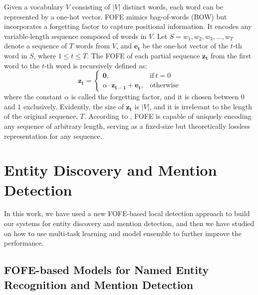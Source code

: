 \documentclass[11pt]{article}
\begin{document}
Given a vocabulary $V$ consisting of $|V|$ distinct words, each word can be represented by a one-hot vector. 
FOFE mimics bag-of-words (BOW) but incorporates a forgetting factor to capture positional information.
It encodes any variable-length sequence composed of words in $V$. 
Let $S = {w_1, w_2, w_3, ... , w_T}$ denote a sequence of $T$ words from $V$, 
and $\bm{e_t}$ be the one-hot vector of the $t$-th word in $S$, where $1 \leq t \leq T$.
The FOFE of each partial sequence $\bm{z_t}$ from the first word to the $t$-th word is recursively defined as:
\begin{equation}
\bm{z_t}=
\begin{cases}
\bm{0}, & \text{if}\ t = 0 \\
\alpha \cdot \bm{z_{t - 1}} + \bm{e_t}, & \text{otherwise}
\end{cases}  \label{eq_FOFE_formula}
\end{equation}
where the constant $\alpha$ is called the forgetting factor, and it is chosen between $0$ and $1$ exclusively. 
Evidently, the size of $\bm{z_t}$ is $|V|$, and it is irrelevant to the length of the original sequence, $T$.
According to \cite{zhang2015fixed}, FOFE is capable of uniquely encoding any sequence of arbitrary length, serving as a fixed-size but theoretically lossless representation for any sequence.

\section{Entity Discovery and Mention Detection}

In this work, we have used a new FOFE-based local detection approach to build our systems for 
entity discovery and mention detection, and then we have studied on how to use multi-task learning and model ensemble to further improve the performance. 

\subsection{FOFE-based Models for Named Entity Recognition and Mention Detection}
\end{document}
